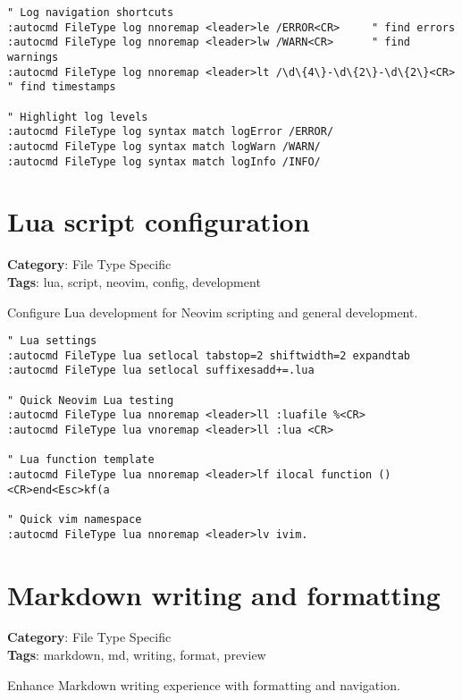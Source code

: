 {{{{{{\begin{Exa*}{}
\begin{Verbatim}[fontsize=\footnotesize, breaklines, breakanywhere]
" Log navigation shortcuts
:autocmd FileType log nnoremap <leader>le /ERROR<CR>     " find errors
:autocmd FileType log nnoremap <leader>lw /WARN<CR>      " find warnings
:autocmd FileType log nnoremap <leader>lt /\d\{4\}-\d\{2\}-\d\{2\}<CR>  " find timestamps

" Highlight log levels
:autocmd FileType log syntax match logError /ERROR/
:autocmd FileType log syntax match logWarn /WARN/
:autocmd FileType log syntax match logInfo /INFO/
\end{Verbatim}
\end{Exa*}

\section{Lua script configuration}

\textbf{Category}: File Type Specific\\ \textbf{Tags}: lua, script, neovim, config, development
\vspace{0.5cm}

Configure Lua development for Neovim scripting and general development.

\begin{Exa*}{}
\begin{Verbatim}[fontsize=\footnotesize, breaklines, breakanywhere]
" Lua settings  
:autocmd FileType lua setlocal tabstop=2 shiftwidth=2 expandtab
:autocmd FileType lua setlocal suffixesadd+=.lua

" Quick Neovim Lua testing
:autocmd FileType lua nnoremap <leader>ll :luafile %<CR>
:autocmd FileType lua vnoremap <leader>ll :lua <CR>

" Lua function template
:autocmd FileType lua nnoremap <leader>lf ilocal function ()<CR>end<Esc>kf(a

" Quick vim namespace
:autocmd FileType lua nnoremap <leader>lv ivim.
\end{Verbatim}
\end{Exa*}

\section{Markdown writing and formatting}

\textbf{Category}: File Type Specific\\ \textbf{Tags}: markdown, md, writing, format, preview
\vspace{0.5cm}

Enhance Markdown writing experience with formatting and navigation.

}}}}}}
